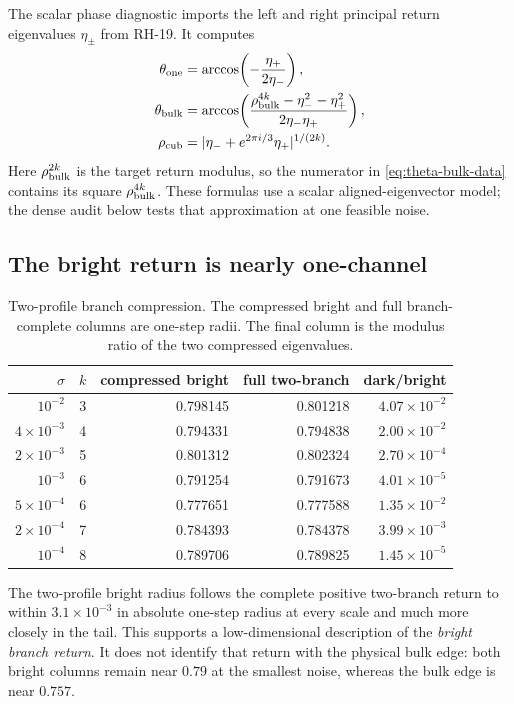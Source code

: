 \documentclass[11pt]{article}
\theoremstyle{definition}
\theoremstyle{remark}
\begin{document}
The scalar phase diagnostic imports the left and right principal return
eigenvalues $\eta_\pm$ from RH-19.  It computes
\begin{align}
 \theta_{\rm one}
 &=\arccos\!\left(-\frac{\eta_+}{2\eta_-}\right),
 \label{eq:theta-one-data}\\
 \theta_{\rm bulk}
 &=\arccos\!\left(
 \frac{\rho_{\rm bulk}^{4k}-\eta_-^2-\eta_+^2}
 {2\eta_-\eta_+}
 \right),
 \label{eq:theta-bulk-data}\\
 \rho_{\rm cub}
 &=|\eta_-+e^{2\pi i/3}\eta_+|^{1/(2k)}.
 \label{eq:cubic-radius-data}
\end{align}
Here $\rho_{\rm bulk}^{2k}$ is the target return modulus, so the numerator in
\eqref{eq:theta-bulk-data} contains its square
$\rho_{\rm bulk}^{4k}$.  These formulas use a scalar aligned-eigenvector
model; the dense audit below tests that approximation at one feasible noise.

\subsection{The bright return is nearly one-channel}

\begin{table}[H]
\centering
\small
\caption{Two-profile branch compression.  The compressed bright and full
branch-complete columns are one-step radii.  The final column is the modulus
ratio of the two compressed eigenvalues.}
\label{tab:two-profile}
\begin{tabular}{rrrrr}
\toprule
$\sigma$ & $k$ & compressed bright & full two-branch & dark/bright\\
\midrule
$10^{-2}$        &3&0.798145&0.801218&$4.07\times10^{-2}$\\
$4\times10^{-3}$ &4&0.794331&0.794838&$2.00\times10^{-2}$\\
$2\times10^{-3}$ &5&0.801312&0.802324&$2.70\times10^{-4}$\\
$10^{-3}$        &6&0.791254&0.791673&$4.01\times10^{-5}$\\
$5\times10^{-4}$ &6&0.777651&0.777588&$1.35\times10^{-2}$\\
$2\times10^{-4}$ &7&0.784393&0.784378&$3.99\times10^{-3}$\\
$10^{-4}$        &8&0.789706&0.789825&$1.45\times10^{-5}$\\
\bottomrule
\end{tabular}
\end{table}

The two-profile bright radius follows the complete positive two-branch
return to within $3.1\times10^{-3}$ in absolute one-step radius at every
scale and much more closely in the tail.  This supports a low-dimensional
description of the \emph{bright branch return}.  It does not identify that
return with the physical bulk edge: both bright columns remain near $0.79$
at the smallest noise, whereas the bulk edge is near $0.757$.
\end{document}
